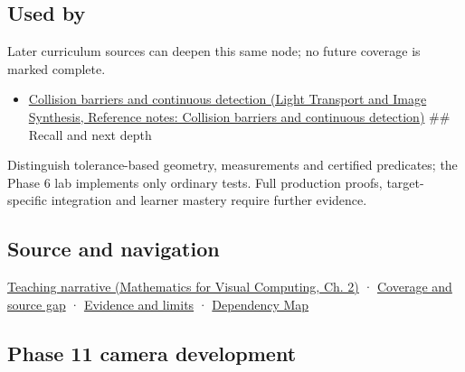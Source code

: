 \subsection{Used by}\label{appendix-341296fb3f64-used-by}

\hypertarget{appendix-341296fb3f64-used-by}{}

Later curriculum sources can deepen this same node; no future coverage is marked complete.

\begin{itemize}
\tightlist
\item
  \href{../04-Light-Transport-and-Image-Synthesis/main.pdf\#nameddest=appendix-a9ba01fa72a6}{Collision barriers and continuous detection (Light Transport and Image Synthesis, Reference notes: Collision barriers and continuous detection)} \#\# Recall and next depth
\end{itemize}

Distinguish tolerance-based geometry, measurements and certified predicates; the Phase 6 lab implements only ordinary tests. Full production proofs, target-specific integration and learner mastery require further evidence.

\subsection{Source and navigation}\label{appendix-341296fb3f64-source-and-navigation}

\hypertarget{appendix-341296fb3f64-source-and-navigation}{}

\href{../02-Mathematics-for-Visual-Computing/main.pdf\#nameddest=01-foundations-i-ch018-the-sensor-needs-coordinates-inside-the-triangle}{Teaching narrative (Mathematics for Visual Computing, Ch. 2)} · \hyperref[appendix-fd090d982a15-phase-6---parts-501-600]{Coverage and source gap} · \hyperref[appendix-a103e7846d21-phase-6---source-analysis-and-verification]{Evidence and limits} · \hyperref[appendix-4ad47bdd269a]{Dependency Map}

\subsection{Phase 11 camera development}\label{appendix-341296fb3f64-phase-11-camera-development}

\hypertarget{appendix-341296fb3f64-phase-11-camera-development}{}

